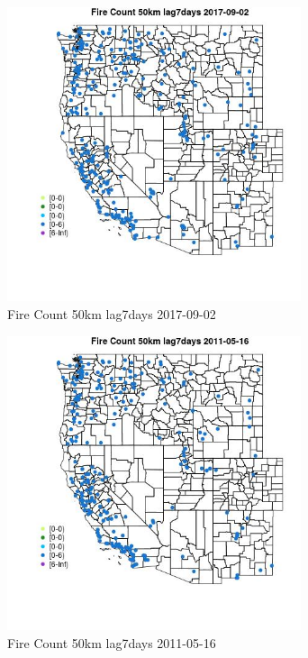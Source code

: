 \begin{figure} 
\centering  
\includegraphics[width=0.77\textwidth]{Code_Outputs/Report_ML_input_PM25_Step4_part_e_de_duplicated_aves_compiled_2019-05-20wNAs_MapObsFire_Count_50km_lag7days2017-09-02.jpg} 
\caption{\label{fig:Report_ML_input_PM25_Step4_part_e_de_duplicated_aves_compiled_2019-05-20wNAsMapObsFire_Count_50km_lag7days2017-09-02}Fire Count 50km lag7days 2017-09-02} 
\end{figure} 
 

\begin{figure} 
\centering  
\includegraphics[width=0.77\textwidth]{Code_Outputs/Report_ML_input_PM25_Step4_part_e_de_duplicated_aves_compiled_2019-05-20wNAs_MapObsFire_Count_50km_lag7days2011-05-16.jpg} 
\caption{\label{fig:Report_ML_input_PM25_Step4_part_e_de_duplicated_aves_compiled_2019-05-20wNAsMapObsFire_Count_50km_lag7days2011-05-16}Fire Count 50km lag7days 2011-05-16} 
\end{figure} 
 

